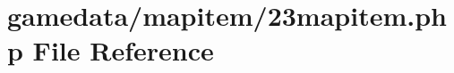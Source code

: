 \hypertarget{23mapitem_8php}{\section{gamedata/mapitem/23mapitem.php File Reference}
\label{23mapitem_8php}
}
